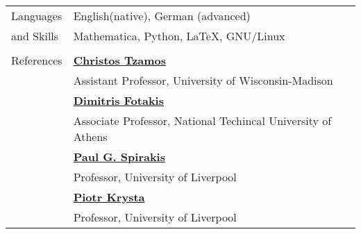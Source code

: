 \documentclass[letterpaper,11pt,oneside]{article}
\begin{document}
\begin{longtable}{@{} l l}
  \Large{Languages}   & English(native), German (advanced) \\
\Large{and Skills}    & Mathematica, Python, \LaTeX, GNU/Linux\\
&\\


 \Large{References}
 & \href{http://www.professorone.com}{\textbf{Christos Tzamos}} \\
 & Assistant Professor, University of Wisconsin-Madison \\
 & \href{http://www.professortwo.com}{\textbf{Dimitris Fotakis}} \\
 & Associate Professor, National Techincal University of Athens\\
 & \href{http://www.professortwo.com}{\textbf{Paul G. Spirakis}} \\
 & Professor, University of Liverpool\\
 & \href{http://www.professortwo.com}{\textbf{Piotr Krysta}} \\
 & Professor, University of Liverpool\\
\end{longtable}
\end{document}
